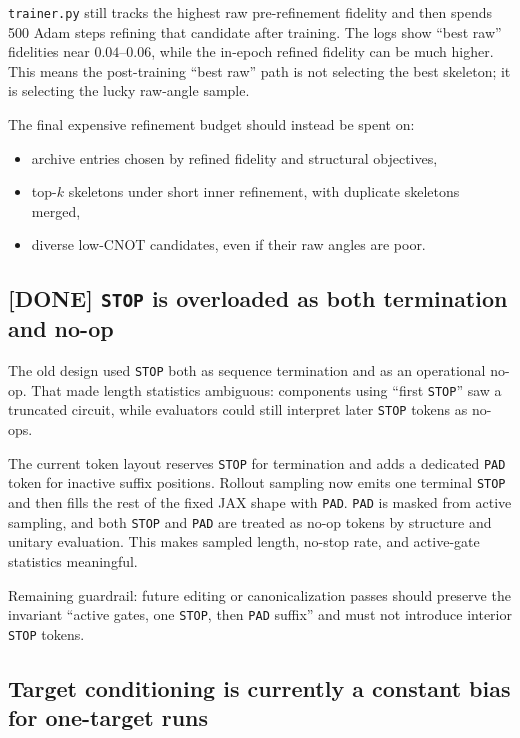 \documentclass[11pt]{article}
\begin{document}
\texttt{trainer.py} still tracks the highest raw pre-refinement fidelity and
then spends 500 Adam steps refining that candidate after training.  The logs show
``best raw'' fidelities near \(0.04\)--\(0.06\), while the in-epoch refined
fidelity can be much higher.  This means the post-training ``best raw'' path is
not selecting the best skeleton; it is selecting the lucky raw-angle sample.

The final expensive refinement budget should instead be spent on:
\begin{itemize}
  \item archive entries chosen by refined fidelity and structural objectives,
  \item top-\(k\) skeletons under short inner refinement, with duplicate
  skeletons merged,
  \item diverse low-CNOT candidates, even if their raw angles are poor.
\end{itemize}

\subsection{[DONE] \texttt{STOP} is overloaded as both termination and no-op}

The old design used \texttt{STOP} both as sequence termination and as an
operational no-op.  That made length statistics ambiguous: components using
``first \texttt{STOP}'' saw a truncated circuit, while evaluators could still
interpret later \texttt{STOP} tokens as no-ops.

The current token layout reserves \texttt{STOP} for termination and adds a
dedicated \texttt{PAD} token for inactive suffix positions.  Rollout sampling
now emits one terminal \texttt{STOP} and then fills the rest of the fixed JAX
shape with \texttt{PAD}.  \texttt{PAD} is masked from active sampling, and both
\texttt{STOP} and \texttt{PAD} are treated as no-op tokens by structure and
unitary evaluation.  This makes sampled length, no-stop rate, and active-gate
statistics meaningful.

Remaining guardrail: future editing or canonicalization passes should preserve
the invariant ``active gates, one \texttt{STOP}, then \texttt{PAD} suffix'' and
must not introduce interior \texttt{STOP} tokens.

\subsection{Target conditioning is currently a constant bias for one-target
runs}
\end{document}
